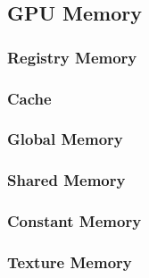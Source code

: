 \subsection{GPU Memory}\label{gpu:sec:mem}
%
\subsubsection{Registry Memory}\label{gpu:ssec:reg}
%
\subsubsection{Cache}\label{gpu:ssec:cache}
%
\subsubsection{Global Memory}\label{gpu:ssec:gm}
%
\subsubsection{Shared Memory}\label{gpu:ssec:sm}
%
\subsubsection{Constant Memory}\label{gpu:ssec:cm}
%
\subsubsection{Texture Memory}\label{gpu:ssec:tm}
